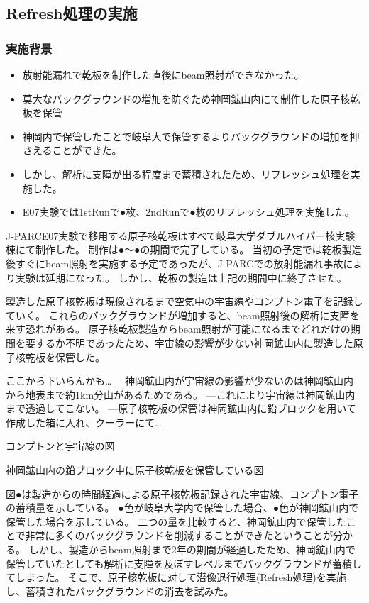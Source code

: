 \documentclass[12pt,a4paper]{jarticle}
\begin{document}
\subsection{Refresh処理の実施}
\subsubsection{実施背景}
\begin{itemize}
 \item 放射能漏れで乾板を制作した直後にbeam照射ができなかった。
 \item 莫大なバックグラウンドの増加を防ぐため神岡鉱山内にて制作した原子核乾板を保管
 \item 神岡内で保管したことで岐阜大で保管するよりバックグラウンドの増加を押さえることができた。
 \item しかし、解析に支障が出る程度まで蓄積されたため、リフレッシュ処理を実施した。
 \item E07実験では1stRunで●枚、2ndRunで●枚のリフレッシュ処理を実施した。
\end{itemize}
J-PARCE07実験で移用する原子核乾板はすべて岐阜大学ダブルハイパー核実験棟にて制作した。
制作は●～●の期間で完了している。
当初の予定では乾板製造後すぐにbeam照射を実施する予定であったが、J-PARCでの放射能漏れ事故により実験は延期になった。
しかし、乾板の製造は上記の期間中に終了させた。
\par
製造した原子核乾板は現像されるまで空気中の宇宙線やコンプトン電子を記録していく。
これらのバックグラウンドが増加すると、beam照射後の解析に支障を来す恐れがある。
原子核乾板製造からbeam照射が可能になるまでどれだけの期間を要するか不明であったため、宇宙線の影響が少ない神岡鉱山内に製造した原子核乾板を保管した。
\par
ここから下いらんかも…
---神岡鉱山内が宇宙線の影響が少ないのは神岡鉱山内から地表まで約1km分山があるためである。
---これにより宇宙線は神岡鉱山内まで透過してこない。
---原子核乾板の保管は神岡鉱山内に鉛ブロックを用いて作成した箱に入れ、クーラーにて…
\par
コンプトンと宇宙線の図
\par
神岡鉱山内の鉛ブロック中に原子核乾板を保管している図
\par
図●は製造からの時間経過による原子核乾板記録された宇宙線、コンプトン電子の蓄積量を示している。
●色が岐阜大学内で保管した場合、●色が神岡鉱山内で保管した場合を示している。
二つの量を比較すると、神岡鉱山内で保管したことで非常に多くのバックグラウンドを削減することができたということが分かる。
しかし、製造からbeam照射まで2年の期間が経過したため、神岡鉱山内で保管していたとしても解析に支障を及ぼすレベルまでバックグラウンドが蓄積してしまった。
そこで、原子核乾板に対して潜像退行処理(Refresh処理)を実施し、蓄積されたバックグラウンドの消去を試みた。
\end{document}
